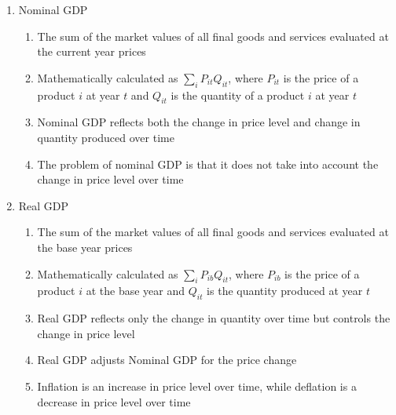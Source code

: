 \documentclass[12pt]{article}
\begin{document}
\begin{enumerate}
        \begin{enumerate}

          \item Nominal GDP

            \begin{enumerate}

              \item The sum of the market values of all final goods and services evaluated at the current year prices

              \item Mathematically calculated as $\sum_i P_{it}Q_{it}$, where $P_{it}$ is the price of a product $i$ at year $t$ and $Q_{it}$ is the quantity of a product $i$ at year $t$

              \item Nominal GDP reflects both the change in price level and change in quantity produced over time

              \item The problem of nominal GDP is that it does not take into account the change in price level over time

            \end{enumerate}

          \item Real GDP

            \begin{enumerate}

              \item The sum of the market values of all final goods and services evaluated at the base year prices

              \item Mathematically calculated as $\sum_i P_{ib}Q_{it}$, where $P_{ib}$ is the price of a product $i$ at the base year and $Q_{it}$ is the quantity produced at year $t$

              \item Real GDP reflects only the change in quantity over time but controls the change in price level

              \item Real GDP adjusts Nominal GDP for the price change

              \item Inflation is an increase in price level over time, while deflation is a decrease in price level over time

            \end{enumerate}


\end{enumerate}
\end{enumerate}
\end{document}
